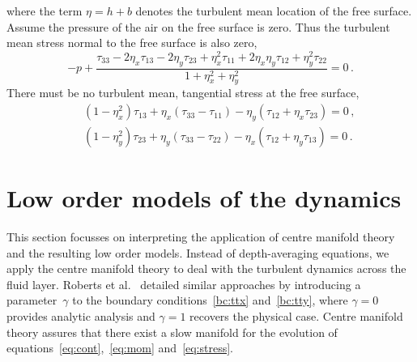 \documentclass[twocolumn]{afmc_art}
\begin{document}
where the term $\eta=h+b$ denotes the turbulent mean location of the free surface. Assume the pressure of the air on the free surface is zero. 
Thus the turbulent mean stress normal to the free surface is also zero,
\begin{equation}
    -p+\frac{\tau_{33} -2\eta_x\tau_{13} -2\eta_y\tau_{23}
    +\eta_x^2\tau_{11} +2\eta_x\eta_y\tau_{12}+\eta_y^2\tau_{22}}
    {1+\eta_x^2+\eta_y^2}
     =0\,.
    \label{bc:ttz}
\end{equation}
There must be no turbulent mean, tangential stress at the free surface,
\begin{eqnarray}&&
    (1-\eta_x^2)\tau_{13}+\eta_x(\tau_{33}-\tau_{11})-\eta_y(\tau_{12}+\eta_x\tau_{23})=0\,,
    \label{bc:ttx} \\&&
    (1-\eta_y^2)\tau_{23}+\eta_y(\tau_{33}-\tau_{22})
    -\eta_x(\tau_{12}+\eta_y\tau_{13})=0\,.
    \label{bc:tty}
\end{eqnarray}




\section{Low order models of the dynamics}

This section focusses on interpreting the application of centre manifold theory and the resulting low order models.
Instead of depth-averaging equations, we apply the centre manifold theory to deal with the turbulent dynamics across the fluid layer. 
Roberts et al.~\cite{Roberts2008,Georgiev2008} detailed similar approaches by introducing a parameter~$\gamma$ to the boundary conditions~\eqref{bc:ttx} and~\eqref{bc:tty}, where $\gamma=0$ provides analytic analysis and $\gamma=1$ recovers the physical case. 
Centre manifold theory assures that there exist a slow manifold for the evolution of equations~\eqref{eq:cont},~\eqref{eq:mom} and~\eqref{eq:stress}.
 
\end{document}
